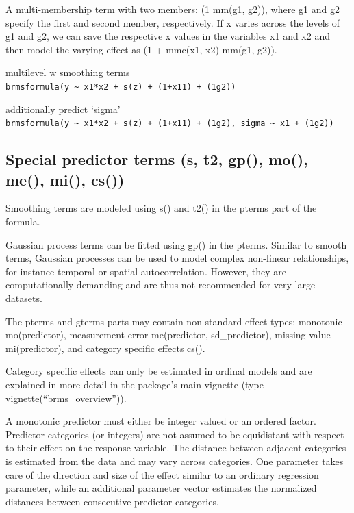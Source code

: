 \documentclass[]{book}
\begin{document}
A multi-membership term with two members: (1 \textbar{} mm(g1, g2)), where g1 and g2 specify the first and second member, respectively. If x varies across the levels of g1 and g2, we can save the respective x values in the variables x1 and x2 and then model the varying effect as (1 + mmc(x1, x2) \textbar{} mm(g1, g2)).

multilevel w smoothing terms \texttt{brmsformula(y\ \textasciitilde{}\ x1*x2\ +\ s(z)\ +\ (1+x1\textbar{}1)\ +\ (1\textbar{}g2))}

additionally predict `sigma' \texttt{brmsformula(y\ \textasciitilde{}\ x1*x2\ +\ s(z)\ +\ (1+x1\textbar{}1)\ +\ (1\textbar{}g2),\ sigma\ \textasciitilde{}\ x1\ +\ (1\textbar{}g2))}

\hypertarget{special-predictor-terms-s-t2-gp-mo-me-mi-cs}{%
\subsection{Special predictor terms (s, t2, gp(), mo(), me(), mi(), cs())}\label{special-predictor-terms-s-t2-gp-mo-me-mi-cs}}

Smoothing terms are modeled using s() and t2() in the pterms part of the formula.

Gaussian process terms can be fitted using gp() in the pterms. Similar to smooth terms, Gaussian processes can be used to model complex non-linear relationships, for instance temporal or spatial autocorrelation. However, they are computationally demanding and are thus not recommended for very large datasets.

The pterms and gterms parts may contain non-standard effect types: monotonic mo(predictor), measurement error me(predictor, sd\_predictor), missing value mi(predictor), and category specific effects cs().

Category specific effects can only be estimated in ordinal models and are explained in more detail in the package's main vignette (type vignette(``brms\_overview'')).

A monotonic predictor must either be integer valued or an ordered factor. Predictor categories (or integers) are not assumed to be equidistant with respect to their effect on the response variable. The distance between adjacent categories is estimated from the data and may vary across categories. One parameter takes care of the direction and size of the effect similar to an ordinary regression parameter, while an additional parameter vector estimates the normalized distances between consecutive predictor categories.
\end{document}
